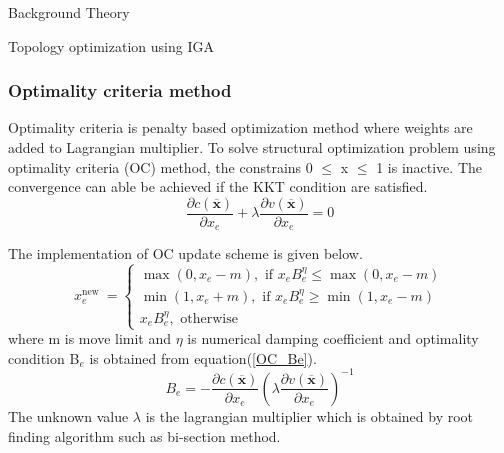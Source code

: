 \documentclass[a4paper,12pt,times]{article}
\begin{document}
\begin{section}{Background Theory}
\begin{subsection}{Topology optimization using IGA}
\subsubsection{Optimality criteria method}
Optimality criteria is penalty based optimization method where weights are added to Lagrangian multiplier. To solve structural optimization problem using optimality criteria (OC) method, the constrains 0 $\leq$  x $\leq$ 1 is inactive. The convergence can able be achieved if the KKT condition are satisfied.\citep{3dtopo} 
\begin{equation}
\frac{\partial c(\overline{\mathbf{x}})}{\partial x_{e}}+\lambda \frac{\partial v(\overline{\mathbf{x}})}{\partial x_{e}}=0
\end{equation}

The implementation of OC update scheme is given below.
\begin{equation}
x_{e}^{\text {new }}=\left\{\begin{array}{l}
\max \left(0, x_{e}-m\right), \text { if } x_{e} B_{e}^{\eta} \leq \max \left(0, x_{e}-m\right) \\
\min \left(1, x_{e}+m\right), \text { if } x_{e} B_{e}^{\eta} \geq \min \left(1, x_{e}-m\right) \\
x_{e} B_{e}^{\eta}, \text { otherwise }
\end{array}\right.
\end{equation}
where m is move limit and $\eta$ is numerical damping coefficient and optimality condition B$_e$ is obtained from equation(\ref{OC_Be}).
\begin{equation}\label{OC_Be}
B_{e}=-\frac{\partial c(\overline{\mathbf{x}})}{\partial x_{e}}\left(\lambda \frac{\partial v(\overline{\mathbf{x}})}{\partial x_{e}}\right)^{-1}
\end{equation}
The unknown value $\lambda$ is the lagrangian multiplier which is obtained by root finding algorithm such as bi-section method.\\


\end{subsection}
\end{section}
\end{document}
